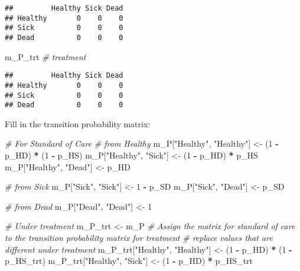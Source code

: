 \documentclass[
]{article}
\newenvironment{Shaded}{\begin{snugshade}}{\end{snugshade}}
\newcommand{\CommentTok}[1]{\textcolor[rgb]{0.56,0.35,0.01}{\textit{#1}}}
\newcommand{\DecValTok}[1]{\textcolor[rgb]{0.00,0.00,0.81}{#1}}
\newcommand{\NormalTok}[1]{#1}
\newcommand{\OperatorTok}[1]{\textcolor[rgb]{0.81,0.36,0.00}{\textbf{#1}}}
\newcommand{\StringTok}[1]{\textcolor[rgb]{0.31,0.60,0.02}{#1}}
\begin{document}
\begin{verbatim}
##         Healthy Sick Dead
## Healthy       0    0    0
## Sick          0    0    0
## Dead          0    0    0
\end{verbatim}

\begin{Shaded}
\begin{Highlighting}[]
\NormalTok{m_P_trt  }\CommentTok{# treatment}
\end{Highlighting}
\end{Shaded}

\begin{verbatim}
##         Healthy Sick Dead
## Healthy       0    0    0
## Sick          0    0    0
## Dead          0    0    0
\end{verbatim}

Fill in the transition probability matrix:

\begin{Shaded}
\begin{Highlighting}[]
\CommentTok{# For Standard of Care }
\CommentTok{# from Healthy}
\NormalTok{m_P[}\StringTok{"Healthy"}\NormalTok{, }\StringTok{"Healthy"}\NormalTok{] <-}\StringTok{ }\NormalTok{(}\DecValTok{1} \OperatorTok{-}\StringTok{ }\NormalTok{p_HD) }\OperatorTok{*}\StringTok{ }\NormalTok{(}\DecValTok{1} \OperatorTok{-}\StringTok{ }\NormalTok{p_HS)}
\NormalTok{m_P[}\StringTok{"Healthy"}\NormalTok{, }\StringTok{"Sick"}\NormalTok{]    <-}\StringTok{ }\NormalTok{(}\DecValTok{1} \OperatorTok{-}\StringTok{ }\NormalTok{p_HD) }\OperatorTok{*}\StringTok{ }\NormalTok{p_HS}
\NormalTok{m_P[}\StringTok{"Healthy"}\NormalTok{, }\StringTok{"Dead"}\NormalTok{]    <-}\StringTok{ }\NormalTok{p_HD}

\CommentTok{# from Sick}
\NormalTok{m_P[}\StringTok{"Sick"}\NormalTok{, }\StringTok{"Sick"}\NormalTok{] <-}\StringTok{ }\DecValTok{1} \OperatorTok{-}\StringTok{ }\NormalTok{p_SD}
\NormalTok{m_P[}\StringTok{"Sick"}\NormalTok{, }\StringTok{"Dead"}\NormalTok{] <-}\StringTok{ }\NormalTok{p_SD}

\CommentTok{# from Dead}
\NormalTok{m_P[}\StringTok{"Dead"}\NormalTok{, }\StringTok{"Dead"}\NormalTok{] <-}\StringTok{ }\DecValTok{1}

\CommentTok{# Under treatment}
\NormalTok{m_P_trt <-}\StringTok{ }\NormalTok{m_P  }\CommentTok{# Assign the matrix for standard of care to the transition probability matrix for treatment}
\CommentTok{# replace values that are different under treatment }
\NormalTok{m_P_trt[}\StringTok{"Healthy"}\NormalTok{, }\StringTok{"Healthy"}\NormalTok{] <-}\StringTok{ }\NormalTok{(}\DecValTok{1} \OperatorTok{-}\StringTok{ }\NormalTok{p_HD) }\OperatorTok{*}\StringTok{ }\NormalTok{(}\DecValTok{1} \OperatorTok{-}\StringTok{ }\NormalTok{p_HS_trt)}
\NormalTok{m_P_trt[}\StringTok{"Healthy"}\NormalTok{, }\StringTok{"Sick"}\NormalTok{]    <-}\StringTok{ }\NormalTok{(}\DecValTok{1} \OperatorTok{-}\StringTok{ }\NormalTok{p_HD) }\OperatorTok{*}\StringTok{ }\NormalTok{p_HS_trt}
\end{Highlighting}
\end{Shaded}
\end{document}
